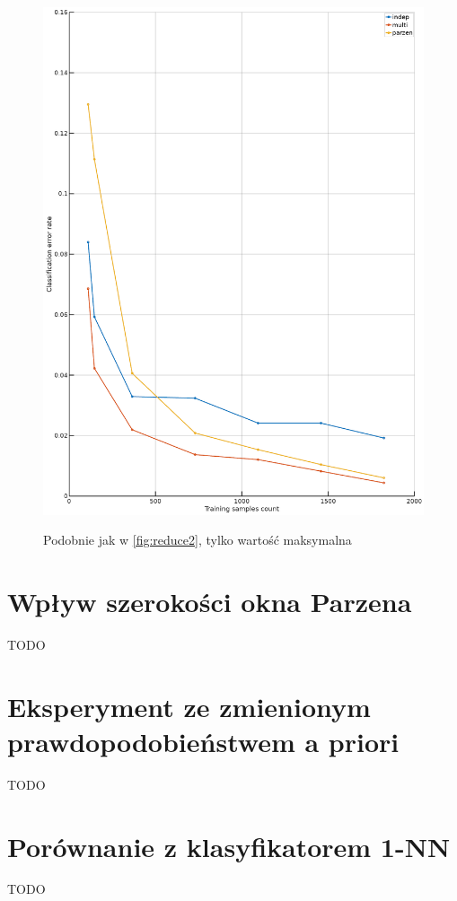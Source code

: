 \documentclass[a4paper]{article}
\begin{document}
\begin{figure}[h]
    \caption[]{Podobnie jak w \ref{fig:reduce2}, tylko wartość maksymalna}
    \centering
    \includegraphics[width=1.0\textwidth]{reduceMax.png}
    \label{fig:reduce3}
\end{figure}

\section{Wpływ szerokości okna Parzena}\label{parzen}
TODO
\section{Eksperyment ze zmienionym prawdopodobieństwem a priori}
TODO
\section{Porównanie z klasyfikatorem 1-NN}
TODO
\end{document}
